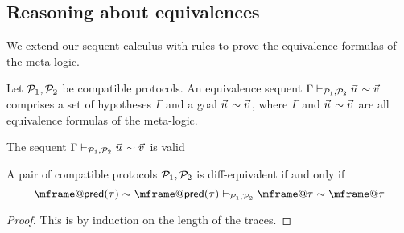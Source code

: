 


\subsection{Reasoning about equivalences}

We extend our sequent calculus with rules to prove the equivalence formulas of the meta-logic.

\begin{definition}
  Let $\mathcal{P}_1,\mathcal{P}_2$ be compatible protocols. An equivalence sequent $\Gamma \vdash_{\calp_1,\calp_2} \pvec{u} \sim \pvec{v}$ comprises a set of hypotheses $\Gamma$ and a goal $\pvec{u} \sim \pvec{v}$, where $\Gamma$ and $\pvec{u} \sim \pvec{v}$ are all equivalence formulas of the meta-logic.

  The sequent  $\Gamma \vdash_{\calp_1,\calp_2} \pvec{u} \sim \pvec{v}$ is valid 
\end{definition}


\begin{lemma}
  A pair of compatible protocols $\mathcal{P}_1,\mathcal{P}_2$ is diff-equivalent if and only if
  \[
    \mframe@\pre(\tau) \sim \mframe@\pre(\tau)
    \vdash_{\calp_1,\calp_2}
    \mframe@\tau \sim \mframe@\tau
  \]
\end{lemma}
\begin{proof}
  This is by induction on the length of the traces.
\end{proof}

